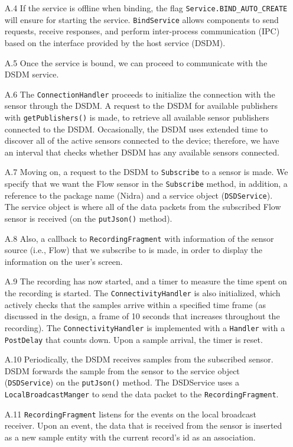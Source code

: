 \begin{itemize}
    \item[A.4] If the service is offline when binding, the flag \verb|Service.BIND_AUTO_CREATE| will ensure for starting the service. \verb|BindService| allows components to send requests, receive responses, and perform inter-process communication (IPC) based on the interface provided by the host service (DSDM). 
    \item[A.5] Once the service is bound, we can proceed to communicate with the DSDM service. 
       \item[A.6] The \verb|ConnectionHandler| proceeds to initialize the connection with the sensor through the DSDM.  A request to the DSDM for available publishers with \verb|getPublishers()| is made, to retrieve all available sensor publishers connected to the DSDM. Occasionally, the DSDM uses extended time to discover all of the active sensors connected to the device; therefore, we have an interval that checks whether DSDM has any available sensors connected. 
    \item[A.7] Moving on,  a request to the DSDM to \verb|Subscribe| to a sensor is made. We specify that we want the Flow sensor in the \verb|Subscribe| method, in addition, a reference to the package name (Nidra) and a service object (\verb|DSDService|). The service object is where all of the data packets from the subscribed Flow sensor is received (on the \verb|putJson()| method).   
    \item[A.8] Also, a callback to \verb|RecordingFragment| with information of the sensor source (i.e., Flow) that we subscribe to is made, in order to display the information on the user's screen. 
    \item[A.9] The recording has now started, and a timer to measure the time spent on the recording is started. The \verb|ConnectivityHandler| is also initialized, which actively checks that the samples arrive within a specified time frame (as discussed in the design, a frame of 10 seconds that increases throughout the recording). The \verb|ConnectivityHandler| is implemented with a \verb|Handler| with a \verb|PostDelay| that counts down. Upon a sample arrival, the timer is reset. 
    \item[A.10] Periodically, the DSDM receives samples from the subscribed sensor. DSDM forwards the sample from the sensor to the service object (\verb|DSDService|) on the \verb|putJson()| method. The DSDService uses a \verb|LocalBroadcastManger| to send the data packet to the \verb|RecordingFragment|.  
    \item[A.11] \verb|RecordingFragment| listens for the events on the local broadcast receiver. Upon an event, the data that is received from the sensor is inserted as a new sample entity with the current record's id as an association. 

\end{itemize}
